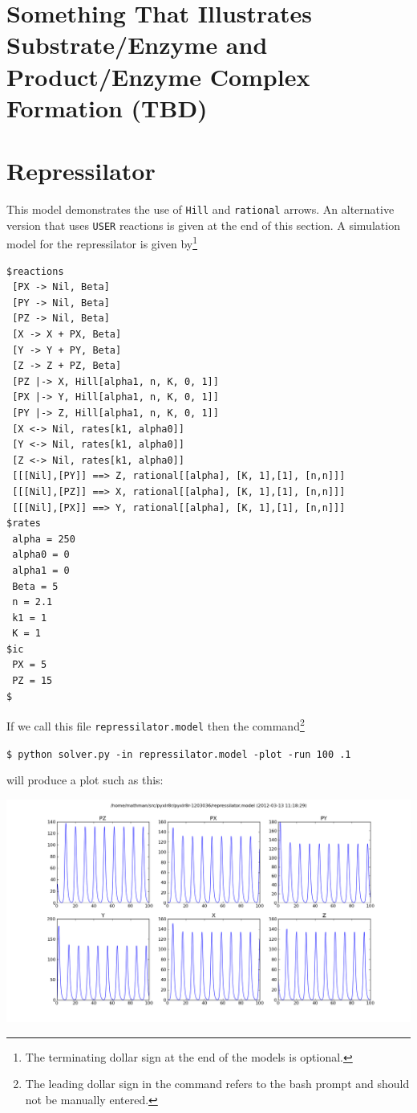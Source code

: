 \section[Enzymes with Intermediate Complex]{Something That Illustrates Substrate/Enzyme and Product/Enzyme Complex Formation (TBD)} 

\section{Repressilator}
This model demonstrates the use of {\tt Hill} and {\tt rational} arrows.  An alternative version that uses {\tt USER} reactions is given at the end of this section.  A simulation model for the repressilator \cite{Repressilator} is given by\footnote{The terminating dollar sign at the end of the models is optional.}
\begin{center}
\begin{minipage}{4in}
\begin{scriptsize}
\begin{Verbatim}[frame=single]
$reactions
 [PX -> Nil, Beta]
 [PY -> Nil, Beta]
 [PZ -> Nil, Beta]
 [X -> X + PX, Beta]
 [Y -> Y + PY, Beta]
 [Z -> Z + PZ, Beta]
 [PZ |-> X, Hill[alpha1, n, K, 0, 1]]
 [PX |-> Y, Hill[alpha1, n, K, 0, 1]]
 [PY |-> Z, Hill[alpha1, n, K, 0, 1]]
 [X <-> Nil, rates[k1, alpha0]]
 [Y <-> Nil, rates[k1, alpha0]]
 [Z <-> Nil, rates[k1, alpha0]]
 [[[Nil],[PY]] ==> Z, rational[[alpha], [K, 1],[1], [n,n]]]
 [[[Nil],[PZ]] ==> X, rational[[alpha], [K, 1],[1], [n,n]]]
 [[[Nil],[PX]] ==> Y, rational[[alpha], [K, 1],[1], [n,n]]]
$rates
 alpha = 250
 alpha0 = 0
 alpha1 = 0
 Beta = 5
 n = 2.1 
 k1 = 1
 K = 1
$ic
 PX = 5
 PZ = 15
$
\end{Verbatim}
\end{scriptsize}
\end{minipage}
\end{center}
If we call this file {\tt repressilator.model} then the command\footnote{The leading dollar sign in the command refers to the bash prompt and should not be manually entered.}
\begin{center}
{\tt  \$ python solver.py -in repressilator.model -plot -run 100 .1}
\end{center}
will produce a plot such as this:
\begin{center}
\includegraphics[width=.9\textwidth]{repressilator.png}
\end{center}
